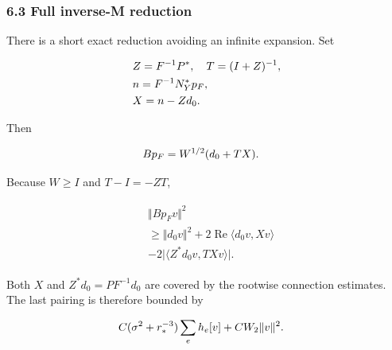 \subsubsection{6.3 Full inverse-M
reduction}\label{e-full-inverse-m-reduction}

There is a short exact reduction avoiding an infinite expansion. Set

\begin{gather*}
\begin{aligned}
& Z=F^{-1} P^{*}, \quad  T=(I+Z)^{-1}, \\
& n=F^{-1} N_{Y}^{*} p_{F}, \\
& X=n-Z d_{0}.
\end{aligned}\notag
\end{gather*}

Then

\begin{gather*}
\begin{aligned}
& B p_{F}=W^{1/2}(d_{0}+T X).
\end{aligned}\notag
\end{gather*}

Because \(W\ge I\) and \(T-I=-ZT\),

\begin{gather*}
\begin{aligned}
& \Vert B p_{F} v\Vert ^{2} \\
& \ge \Vert d_{0} v\Vert ^{2}+2 \operatorname{Re} \langle d_{0} v,Xv\rangle \\
& -2 \vert \langle Z^{*} d_{0} v,T Xv\rangle \vert .
\end{aligned}\tag{21}
\end{gather*}

Both \(X\) and \(Z^{*} d_{0}=P F^{-1} d_{0}\) are covered by the
rootwise connection estimates. The last pairing is therefore bounded by

\begin{gather*}
\begin{aligned}
& C(\sigma ^{2}+r_{*}^{-3}) \sum _{e} h_{e}[v]+C W_{2}\Vert v\Vert ^{2}.
\end{aligned}\notag
\end{gather*}

